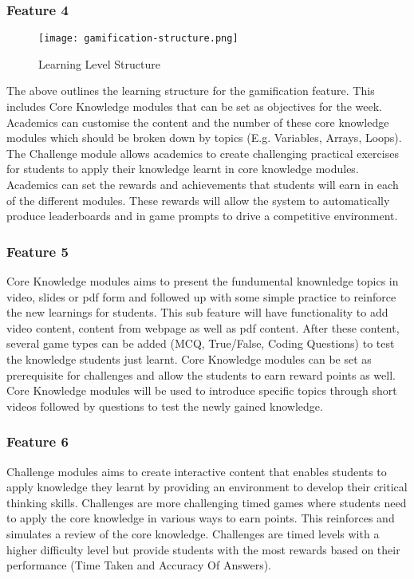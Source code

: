 \subsubsection{Feature 4}
\begin{figure}[h!]
    \texttt{[image: gamification-structure.png]}
    \centering
    \caption{Learning Level Structure}
\end{figure}

The above outlines the learning structure for the gamification feature. This includes Core Knowledge modules that can be set as objectives for the week. Academics can customise the content and the number of these core knowledge modules which should be broken down by topics (E.g. Variables, Arrays, Loops). The Challenge module allows academics to create challenging practical exercises for students to apply their knowledge learnt in core knowledge modules. Academics can set the rewards and achievements that students will earn in each of the different modules. These rewards will allow the system to automatically produce leaderboards and in game prompts to drive a competitive environment.

\subsubsection{Feature 5}
Core Knowledge modules aims to present the fundumental knownledge topics in video, slides or pdf form and followed up with some simple practice to reinforce the new learnings for students.
This sub feature will have functionality to add video content, content from webpage as well as pdf content. After these content, several game types can be added (MCQ, True/False, Coding Questions) to test the knowledge students just learnt. Core Knowledge modules can be set as prerequisite for challenges and allow the students to earn reward points as well. Core Knowledge modules will be used to introduce specific topics through short videos followed by questions to test the newly gained knowledge. 

\subsubsection{Feature 6}
Challenge modules aims to create interactive content that enables students to apply knowledge they learnt by providing an environment to develop their critical thinking skills.
Challenges are more challenging timed games where students need to apply the core knowledge in various ways to earn points. This reinforces and simulates a review of the core knowledge. Challenges are timed levels with a higher difficulty level but provide students with the most rewards based on their performance (Time Taken and Accuracy Of Answers).


